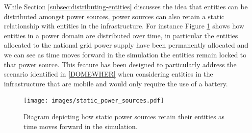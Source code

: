 \documentclass{l4proj}
\begin{document}
While Section \ref{subsec:distributing-entities} discusses the idea that entities can be distributed amongst power sources, power sources can also retain a static relationship with entities in the infrastructure.
For instance Figure \ref{fig:staticPower} shows how entities in a power domain are distributed over time, in particular the entities allocated to the national grid power supply have been permanently allocated and we can see as time moves forward in the simulation the entities remain locked to that power source.
This feature has been designed to particularly address the scenario identified in \ref{DOMEWHER} when considering entities in the infrastructure that are mobile and would only require the use of a battery.

\begin{figure}[h]
    \centering
    \texttt{[image: images/static\_power\_sources.pdf]}
    ~
    \caption{Diagram depicting how static power sources retain their entities as time moves forward in the simulation.}
    \label{fig:staticPower}
\end{figure}
\end{document}
